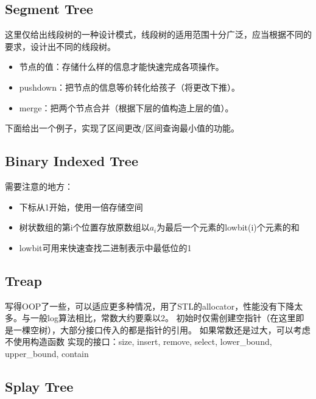 \documentclass[twoside, UTF8]{article}
\begin{document}
		\subsection{Segment Tree}
			\begin{flushleft}
				这里仅给出线段树的一种设计模式，线段树的适用范围十分广泛，应当根据不同的要求，设计出不同的线段树。
				\begin{itemize}
					\item 节点的值：存储什么样的信息才能快速完成各项操作。
					\item pushdown：把节点的信息等价转化给孩子（将更改下推）。
					\item merge：把两个节点合并（根据下层的值构造上层的值）。
				\end{itemize}
				下面给出一个例子，实现了区间更改/区间查询最小值的功能。
			\end{flushleft}
			
		\subsection{Binary Indexed Tree}
			\begin{flushleft}
				需要注意的地方：
				\begin{itemize}
					\item 下标从1开始，使用一倍存储空间
					\item 树状数组的第i个位置存放原数组以$a_{i}$为最后一个元素的lowbit(i)个元素的和
					\item lowbit可用来快速查找二进制表示中最低位的1
				\end{itemize}
			\end{flushleft}
			
		\subsection{Treap}
			\begin{flushleft}
				写得OOP了一些，可以适应更多种情况，用了STL的allocator，性能没有下降太多。与一般log算法相比，常数大约要乘以2。
				\linebreak 初始时仅需创建空指针（在这里即是一棵空树），大部分接口传入的都是指针的引用。
				\linebreak 如果常数还是过大，可以考虑不使用构造函数
				\linebreak 实现的接口：size, insert, remove, select, lower\_bound, upper\_bound, contain
			\end{flushleft}
			
		\subsection{Splay Tree}
			
	\newpage
\end{document}
